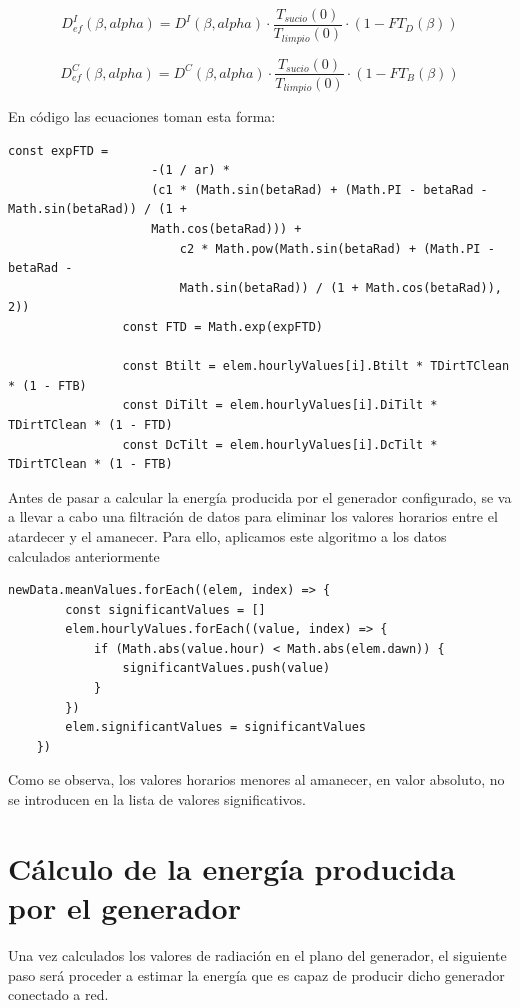 \begin{equation}
D_{ef}^I(\beta, alpha) = D^I(\beta, alpha) \cdot \frac{T_{sucio}(0)}{T_{limpio}(0)} \cdot (1-FT_D(\beta))
\end{equation}

\begin{equation}
D_{ef}^C(\beta, alpha) = D^C(\beta, alpha) \cdot \frac{T_{sucio}(0)}{T_{limpio}(0)} \cdot (1-FT_B(\beta))
\end{equation}

En código las ecuaciones toman esta forma:
\begin{lstlisting}[style=ES6, caption={Cálculo de las componentes efectivas}]
				const expFTD =
					-(1 / ar) *
					(c1 * (Math.sin(betaRad) + (Math.PI - betaRad - Math.sin(betaRad)) / (1 + 
					Math.cos(betaRad))) +
						c2 * Math.pow(Math.sin(betaRad) + (Math.PI - betaRad - 
						Math.sin(betaRad)) / (1 + Math.cos(betaRad)), 2))
				const FTD = Math.exp(expFTD)

				const Btilt = elem.hourlyValues[i].Btilt * TDirtTClean * (1 - FTB)
				const DiTilt = elem.hourlyValues[i].DiTilt * TDirtTClean * (1 - FTD)
				const DcTilt = elem.hourlyValues[i].DcTilt * TDirtTClean * (1 - FTB)
\end{lstlisting}

Antes de pasar a calcular la energía producida por el generador configurado, se va a llevar a cabo una filtración de datos para eliminar los valores horarios entre el atardecer y el amanecer.
Para ello, aplicamos este algoritmo a los datos calculados anteriormente
\begin{lstlisting}[style=ES6, caption={Selección de los valores clave}]
	newData.meanValues.forEach((elem, index) => {
		const significantValues = []
		elem.hourlyValues.forEach((value, index) => {
			if (Math.abs(value.hour) < Math.abs(elem.dawn)) {
				significantValues.push(value)
			}
		})
		elem.significantValues = significantValues
	})
\end{lstlisting}
Como se observa, los valores horarios menores al amanecer, en valor absoluto, no se introducen en la lista de valores significativos.

\section{Cálculo de la energía producida por el generador}

Una vez calculados los valores de radiación en el plano del generador, el siguiente paso será proceder a estimar la energía que es capaz de producir dicho generador conectado a red.\\

